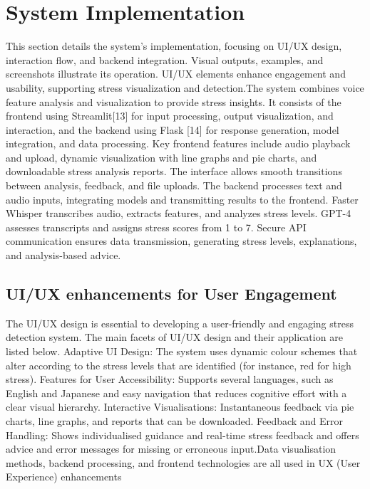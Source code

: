 \documentclass[a4j, twocolumn]{article}
\begin{document}
\section{System Implementation}
 This section details the system’s implementation, focusing on UI/UX design, interaction flow, and backend integration. Visual outputs, examples, and screenshots illustrate its operation. UI/UX elements enhance engagement and usability, supporting stress visualization and detection.The system combines voice feature analysis and visualization to provide stress insights. It consists of the frontend using Streamlit[13] for input processing, output visualization, and interaction, and the backend using Flask [14] for response generation, model integration, and data processing. Key frontend features include audio playback and upload, dynamic visualization with line graphs and pie charts, and downloadable stress analysis reports. The interface allows smooth transitions between analysis, feedback, and file uploads. The backend processes text and audio inputs, integrating models and transmitting results to the frontend. Faster Whisper transcribes audio, extracts features, and analyzes stress levels. GPT-4 assesses transcripts and assigns stress scores from 1 to 7. Secure API communication ensures data transmission, generating stress levels, explanations, and analysis-based advice.

 \subsection{UI/UX enhancements for User Engagement}
 The UI/UX design is essential to developing a user-friendly and engaging stress detection system. The main facets of UI/UX design and their application are listed below. Adaptive UI Design: The system uses dynamic colour schemes that alter according to the stress levels that are identified (for instance, red for high stress). Features for User Accessibility: Supports several languages, such as English and Japanese and easy navigation that reduces cognitive effort with a clear visual hierarchy.  Interactive Visualisations: Instantaneous feedback via pie charts, line graphs, and reports that can be downloaded. Feedback and Error Handling: Shows individualised guidance and real-time stress feedback and offers advice and error messages for missing or erroneous input.Data visualisation methods, backend processing, and frontend technologies are all used in UX (User Experience) enhancements

\end{document}
